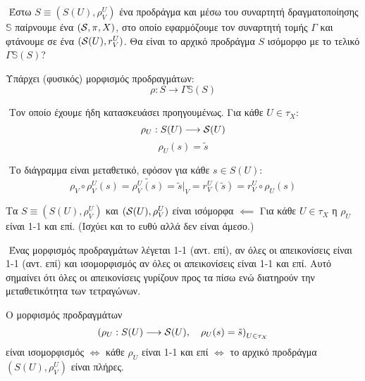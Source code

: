 $ $\newline
Έστω $ S \equiv (S(U),\rho^U_V)$ ένα προδράγμα και μέσω του συναρτητή δραγματοποίησης $\mathbb{S}$ παίρνουμε ένα $(\mathcal{S}, \pi, X)$, στο οποίο εφαρμόζουμε τον συναρτητή τομής $\Gamma$ και φτάνουμε σε ένα $(\mathcal{S} (U), r^U_V)$. Θα είναι το αρχικό προδράγμα $S$ ισόμορφο με το τελικό $\Gamma \mathbb{S} (S)$?

\begin{lemma} Υπάρχει (φυσικός) μορφισμός προδραγμάτων:
    $$\rho : S \longrightarrow \Gamma \mathbb{S}(S)$$
    \begin{figure}[H]
        \centering
    \end{figure}

\end{lemma}

$ $\newline
Τον οποίο έχουμε ήδη κατασκευάσει προηγουμένως. Για κάθε $U \in \tau_X$:
$$\rho_U: S(U) \longrightarrow \mathcal{S} (U)$$
$$\rho_U (s) = \tilde{s}$$

$ $\newline
Το διάγραμμα είναι μεταθετικό, εφόσον για κάθε $s \in S(U)$:
$$\rho_V \circ \rho^U_V (s) = \widetilde{\rho^U_V(s)} = \tilde{s}|_V = r^U_V ( \tilde{s}) = r^U_V \circ \rho_U (s)$$


\begin{remark}
    Τα $S \equiv (S(U), \rho^U_V)$ και $(\mathcal{S} (U),\rho^U_V)$ είναι ισόμορφα $\impliedby$ Για κάθε $U \in \tau_X$ η $\rho_U$ είναι 1-1 και επί. (Ισχύει και το ευθύ αλλά δεν είναι άμεσο.)

    $ $\newline
    Ένας μορφισμός προδραγμάτων λέγεται 1-1 (αντ. επί), αν όλες οι απεικονίσεις είναι 1-1 (αντ. επί) και ισομορφισμός αν όλες οι απεικονίσεις είναι 1-1 και επί. Αυτό σημαίνει ότι όλες οι απεικονίσεις γυρίζουν προς τα πίσω ενώ διατηρούν την μεταθετικότητα των τετραγώνων.
\end{remark}


\begin{theorem} Ο μορφισμός προδραγμάτων
    $$\left(\rho_U : S(U) \longrightarrow \mathcal{S} (U), \quad \rho_U (s) = \tilde{s} \right)_{U \in \tau_X}$$ είναι ισομορφισμός $\iff$ κάθε $\rho_U$ είναι 1-1 και επί $\iff$ το αρχικό προδράγμα $(S(U),\rho^U_V)$ είναι πλήρες.
\end{theorem}



